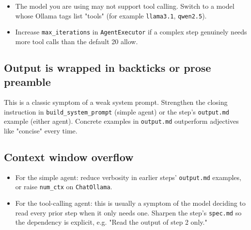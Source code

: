 \documentclass[12pt, a4paper]{article}
\begin{document}
\begin{itemize}[leftmargin=1.5em]
  \item The model you are using may not support tool calling. Switch to a model whose Ollama tags list "tools" (for example \texttt{llama3.1}, \texttt{qwen2.5}).
  \item Increase \texttt{max\_iterations} in \texttt{AgentExecutor} if a complex step genuinely needs more tool calls than the default 20 allow.
\end{itemize}

\subsection{Output is wrapped in backticks or prose preamble}

This is a classic symptom of a weak system prompt. Strengthen the closing instruction in \texttt{build\_system\_prompt} (simple agent) or the step's \texttt{output.md} example (either agent). Concrete examples in \texttt{output.md} outperform adjectives like "concise" every time.

\subsection{Context window overflow}

\begin{itemize}[leftmargin=1.5em]
  \item For the simple agent: reduce verbosity in earlier steps' \texttt{output.md} examples, or raise \texttt{num\_ctx} on \texttt{ChatOllama}.
  \item For the tool-calling agent: this is usually a symptom of the model deciding to read every prior step when it only needs one. Sharpen the step's \texttt{spec.md} so the dependency is explicit, e.g. "Read the output of step 2 only."
\end{itemize}
\end{document}
